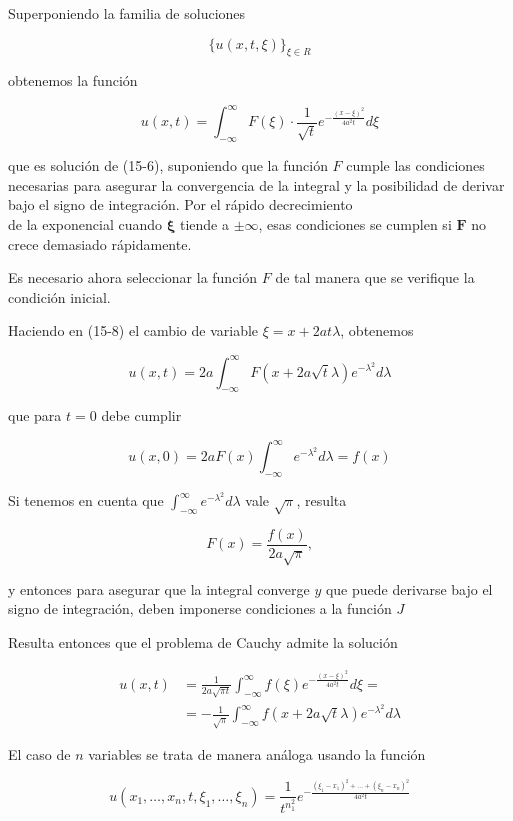 \documentclass[10pt]{article}
\theoremstyle{plain}
\theoremstyle{definition}
\theoremstyle{remark}
\begin{document}
Superponiendo la familia de soluciones

$$
\{u(x, t, \xi)\}_{\xi \in R}
$$

obtenemos la función


\begin{equation*}
u(x, t)=\int_{-\infty}^{\infty} F(\xi) \cdot \frac{1}{\sqrt{t}} e^{-\frac{(x-\xi)^{2}}{4 a^{2} t}} d \xi \tag{15-8}
\end{equation*}


que es solución de (15-6), suponiendo que la función $F$ cumple las condiciones necesarias para asegurar la convergencia de la integral y la posibilidad de derivar bajo el signo de integración. Por el rápido decrecimiento\\
de la exponencial cuando $\boldsymbol{\xi}$ tiende a $\pm \infty$, esas condiciones se cumplen si $\boldsymbol{F}$ no crece demasiado rápidamente.

Es necesario ahora seleccionar la función $F$ de tal manera que se verifique la condición inicial.

Haciendo en (15-8) el cambio de variable $\xi=x+2 a t \lambda$, obtenemos

$$
u(x, t)=2 a \int_{-\infty}^{\infty} F(x+2 a \sqrt{t} \lambda) e^{-\lambda^{2}} d \lambda
$$

que para $t=0$ debe cumplir

$$
u(x, 0)=2 a F(x) \int_{-\infty}^{\infty} e^{-\lambda^{2}} d \lambda=f(x)
$$

Si tenemos en cuenta que $\int_{-\infty}^{\infty} e^{-\lambda^{2}} d \lambda$ vale $\sqrt{\pi}$, resulta

$$
F(x)=\frac{f(x)}{2 a \sqrt{\pi}},
$$

y entonces para asegurar que la integral converge $y$ que puede derivarse bajo el signo de integración, deben imponerse condiciones a la función $J$

Resulta entonces que el problema de Cauchy admite la solución

$$
\begin{aligned}
u(x, t) & =\frac{1}{2 a \sqrt{\pi t}} \int_{-\infty}^{\infty} f(\xi) e^{-\frac{(x-\xi)^{2}}{4 a^{2} t}} d \xi= \\
& =-\frac{1}{\sqrt{\pi}} \int_{-\infty}^{\infty} f(x+2 a \sqrt{t} \lambda) e^{-\lambda^{2}} d \lambda
\end{aligned}
$$

El caso de $n$ variables se trata de manera análoga usando la función

$$
u\left(x_{1}, \ldots, x_{n}, t, \xi_{1}, \ldots, \xi_{n}\right)=\frac{1}{t^{n_{1}^{2}}} e^{-\frac{\left(\xi_{1}-x_{1}\right)^{2}+\ldots+\left(\xi_{n}-x_{n}\right)^{2}}{4 a^{2} t}}
$$
\end{document}
